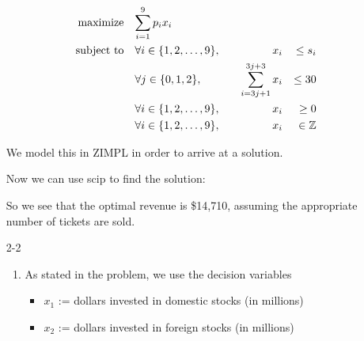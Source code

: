 \documentclass[12pt,letterpaper]{article}
\begin{document}
\begin{enumerate}
      \begin{alignat*}{4}
        \text{maximize}   \quad \mathrlap{\sum_{i = 1}^{9} p_ix_i}                                                            \\
        \text{subject to} \quad & \forall i \in \{1, 2, \dots, 9\}, \quad & x_i                            && \leq s_i        \\
                                & \forall j \in \{0, 1, 2\},        \quad & \sum_{i = 3j + 1}^{3j + 3} x_i && \leq 30         \\
                                & \forall i \in \{1, 2, \dots, 9\}, \quad & x_i                            && \geq 0          \\
                                & \forall i \in \{1, 2, \dots, 9\}, \quad & x_i                            && \in  \mathbb{Z} \\
      \end{alignat*}

      We model this in ZIMPL in order to arrive at a solution.

      

      \pagebreak

      Now we can use scip to find the solution:

      

      So we see that the optimal revenue is \$14,710,
      assuming the appropriate number of tickets are sold.
    \item [2-2]
      \begin{enumerate}
        \item

          As stated in the problem,
          we use the decision variables
          \begin{itemize}
            \item $x_1$ := dollars invested in domestic stocks (in millions)
            \item $x_2$ := dollars invested in foreign stocks (in millions)
          \end{itemize}


\end{enumerate}
\end{enumerate}
\end{document}

